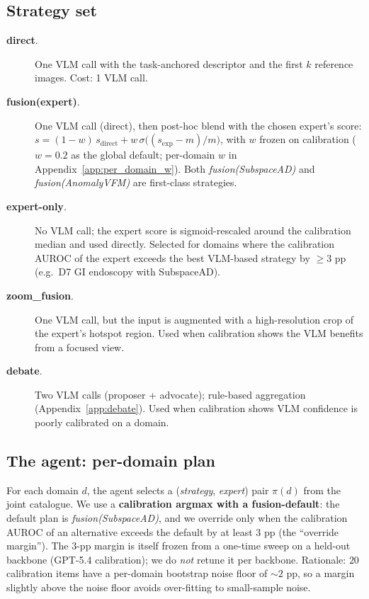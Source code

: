 \subsection{Strategy set}
\label{ssec:strategies}
\begin{description}
    \item[\textbf{direct}.] One VLM call with the task-anchored descriptor and the first $k$ reference images. Cost: 1 VLM call.
    \item[\textbf{fusion(expert)}.] One VLM call (direct), then post-hoc blend with the chosen expert's score: $s = (1-w)\,s_{\mathrm{direct}} + w\,\sigma\!\big((s_{\mathrm{exp}}-m)/m\big)$, with $w$ frozen on calibration ($w{=}0.2$ as the global default; per-domain $w$ in Appendix~\ref{app:per_domain_w}). Both \emph{fusion(SubspaceAD)} and \emph{fusion(AnomalyVFM)} are first-class strategies.
    \item[\textbf{expert-only}.] No VLM call; the expert score is sigmoid-rescaled around the calibration median and used directly. Selected for domains where the calibration AUROC of the expert exceeds the best VLM-based strategy by $\ge 3$ pp (e.g.\ D7 GI endoscopy with SubspaceAD).
    \item[\textbf{zoom\_fusion}.] One VLM call, but the input is augmented with a high-resolution crop of the expert's hotspot region. Used when calibration shows the VLM benefits from a focused view.
    \item[\textbf{debate}.] Two VLM calls (proposer + advocate); rule-based aggregation (Appendix~\ref{app:debate}). Used when calibration shows VLM confidence is poorly calibrated on a domain.
\end{description}

\subsection{The agent: per-domain plan}
\label{ssec:router}
For each domain $d$, the agent selects a (\emph{strategy}, \emph{expert}) pair $\pi(d)$ from the joint catalogue. We use a \textbf{calibration argmax with a fusion-default}: the default plan is \emph{fusion(SubspaceAD)}, and we override only when the calibration AUROC of an alternative exceeds the default by at least $3$ pp (the ``override margin''). The 3-pp margin is itself frozen from a one-time sweep on a held-out backbone (GPT-5.4 calibration); we do \emph{not} retune it per backbone. Rationale: $20$ calibration items have a per-domain bootstrap noise floor of $\sim 2$ pp, so a margin slightly above the noise floor avoids over-fitting to small-sample noise.

